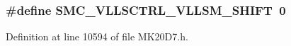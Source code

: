 \subsubsection[{\texorpdfstring{S\+M\+C\+\_\+\+V\+L\+L\+S\+C\+T\+R\+L\+\_\+\+V\+L\+L\+S\+M\+\_\+\+S\+H\+I\+FT}{SMC_VLLSCTRL_VLLSM_SHIFT}}]{\setlength{\rightskip}{0pt plus 5cm}\#define S\+M\+C\+\_\+\+V\+L\+L\+S\+C\+T\+R\+L\+\_\+\+V\+L\+L\+S\+M\+\_\+\+S\+H\+I\+FT~0}\hypertarget{group___s_m_c___register___masks_ga67af6c7ed0835ed408cf511e8b9c9b13}{}\label{group___s_m_c___register___masks_ga67af6c7ed0835ed408cf511e8b9c9b13}


Definition at line 10594 of file M\+K20\+D7.\+h.

